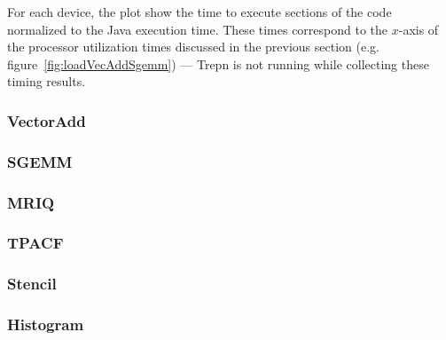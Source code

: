 For each device, the plot show the time to execute sections of the code normalized
  to the Java execution time.
These times correspond to the $x$-axis of the processor utilization times discussed
  in the previous section (e.g. figure~\ref{fig:loadVecAddSgemm}) --- Trepn is not
  running while collecting these timing results.

\subsubsection{VectorAdd}

\subsubsection{SGEMM}

\subsubsection{MRIQ}

\subsubsection{TPACF}

\subsubsection{Stencil}

\subsubsection{Histogram}

